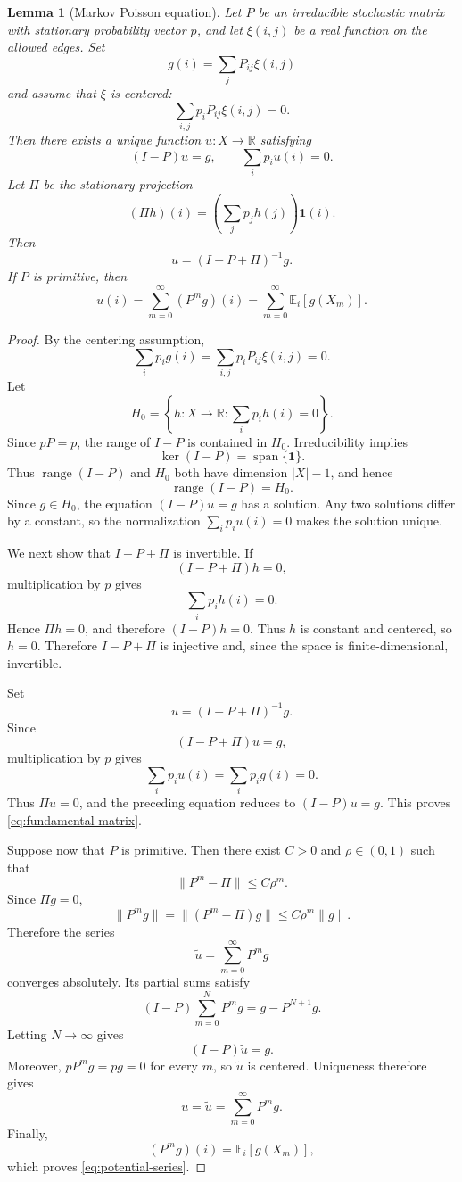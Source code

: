 \documentclass[11pt,a4paper]{amsart}
\newtheorem{lemma}[theorem]{Lemma}
\theoremstyle{definition}
\theoremstyle{remark}
\numberwithin{equation}{section}
\newcommand{\RR}{\mathbb R}
\newcommand{\EE}{\mathbb E}
\newcommand{\1}{\boldsymbol 1}
\begin{document}
\begin{lemma}[Markov Poisson equation]
\label{lem:poisson}
Let $P$ be an irreducible stochastic matrix with stationary
probability vector $p$, and let $\xi(i,j)$ be a real function on
the allowed edges. Set
$$
 g(i)=\sum_j P_{ij}\xi(i,j)
$$
and assume that $\xi$ is centered:
$$
 \sum_{i,j}p_iP_{ij}\xi(i,j)=0.
$$
Then there exists a unique function $u:X\to\RR$ satisfying
\begin{equation}\label{eq:poisson}
 (I-P)u=g,
 \qquad
 \sum_i p_i u(i)=0.
\end{equation}
Let $\Pi$ be the stationary projection
$$
 (\Pi h)(i)
 =
 \left(\sum_j p_jh(j)\right)\1(i).
$$
Then
\begin{equation}\label{eq:fundamental-matrix}
 u=(I-P+\Pi)^{-1}g.
\end{equation}
If $P$ is primitive, then
\begin{equation}\label{eq:potential-series}
 u(i)
 =
 \sum_{m=0}^{\infty}(P^mg)(i)
 =
 \sum_{m=0}^{\infty}\EE_i[g(X_m)].
\end{equation}
\end{lemma}

\begin{proof}
By the centering assumption,
$$
 \sum_i p_i g(i)
 =
 \sum_{i,j}p_iP_{ij}\xi(i,j)
 =
 0.
$$
Let
$$
 H_0
 =
 \left\{
   h:X\to\RR:
   \sum_i p_i h(i)=0
 \right\}.
$$
Since $pP=p$, the range of $I-P$ is contained in $H_0$.
Irreducibility implies
$$
 \ker(I-P)=\operatorname{span}\{\1\}.
$$
Thus $\operatorname{range}(I-P)$ and $H_0$ both have dimension
$|X|-1$, and hence
$$
 \operatorname{range}(I-P)=H_0.
$$
Since $g\in H_0$, the equation $(I-P)u=g$ has a solution.
Any two solutions differ by a constant, so the normalization
$\sum_i p_i u(i)=0$ makes the solution unique.

We next show that $I-P+\Pi$ is invertible. If
$$
 (I-P+\Pi)h=0,
$$
multiplication by $p$ gives
$$
 \sum_i p_i h(i)=0.
$$
Hence $\Pi h=0$, and therefore $(I-P)h=0$. Thus $h$ is
constant and centered, so $h=0$. Therefore $I-P+\Pi$ is
injective and, since the space is finite-dimensional, invertible.

Set
$$
 u=(I-P+\Pi)^{-1}g.
$$
Since
$$
 (I-P+\Pi)u=g,
$$
multiplication by $p$ gives
$$
 \sum_i p_i u(i)
 =
 \sum_i p_i g(i)
 =
 0.
$$
Thus $\Pi u=0$, and the preceding equation reduces to
$(I-P)u=g$. This proves \eqref{eq:fundamental-matrix}.

Suppose now that $P$ is primitive. Then there exist $C>0$ and
$\rho\in(0,1)$ such that
$$
 \|P^m-\Pi\|\le C\rho^m.
$$
Since $\Pi g=0$,
$$
 \|P^mg\|
 =
 \|(P^m-\Pi)g\|
 \le
 C\rho^m\|g\|.
$$
Therefore the series
$$
 \widetilde{u}
 =
 \sum_{m=0}^{\infty}P^mg
$$
converges absolutely. Its partial sums satisfy
$$
 (I-P)\sum_{m=0}^{N}P^mg
 =
 g-P^{N+1}g.
$$
Letting $N\to\infty$ gives
$$
 (I-P)\widetilde{u}=g.
$$
Moreover, $pP^mg=pg=0$ for every $m$, so $\widetilde{u}$ is
centered. Uniqueness therefore gives
$$
 u=\widetilde{u}
   =\sum_{m=0}^{\infty}P^mg.
$$
Finally,
$$
 (P^mg)(i)=\EE_i[g(X_m)],
$$
which proves \eqref{eq:potential-series}.
\end{proof}
\end{document}
